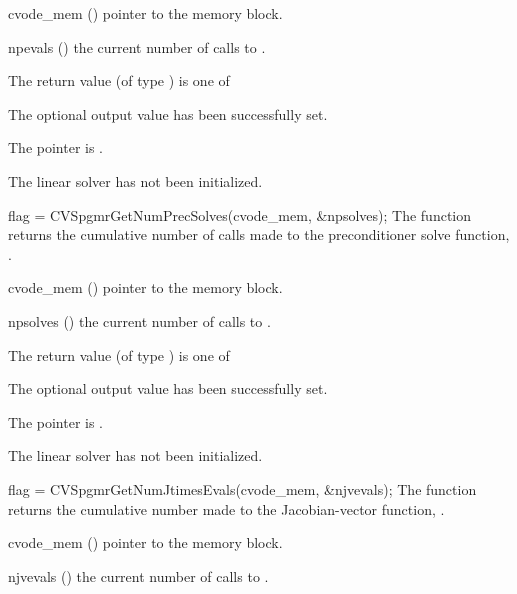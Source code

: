 {
  \begin{args}
  \item[cvode\_mem] ()
    pointer to the {\cvode} memory block.
  \item[npevals] ()
    the current number of calls to .
  \end{args}
}
{
  The return value  (of type ) is one of
  \begin{args}
  \item[\Id{CVSPGMR\_SUCCESS}] 
    The optional output value has been successfully set.
  \item[\Id{CVSPGMR\_MEM\_NULL}]
    The  pointer is .
  \item[\Id{CVSPGMR\_LMEM\_NULL}]
    The {\cvspgmr} linear solver has not been initialized.
  \end{args}
}
{}
{
  flag = CVSpgmrGetNumPrecSolves(cvode\_mem, \&npsolves);
}
{
  The function  returns the
  cumulative number of calls made to the preconditioner 
  solve function, .
}
{
  \begin{args}
  \item[cvode\_mem] ()
    pointer to the {\cvode} memory block.
  \item[npsolves] ()
    the current number of calls to .
  \end{args}
}
{
  The return value  (of type ) is one of
  \begin{args}
  \item[\Id{CVSPGMR\_SUCCESS}] 
    The optional output value has been successfully set.
  \item[\Id{CVSPGMR\_MEM\_NULL}]
    The  pointer is .
  \item[\Id{CVSPGMR\_LMEM\_NULL}]
    The {\cvspgmr} linear solver has not been initialized.
  \end{args}
}
{}
{
  flag = CVSpgmrGetNumJtimesEvals(cvode\_mem, \&njvevals);
}
{
  The function  returns the
  cumulative number made to the Jacobian-vector function,
  .
}
{
  \begin{args}
  \item[cvode\_mem] ()
    pointer to the {\cvode} memory block.
  \item[njvevals] ()
    the current number of calls to .
  \end{args}
}
